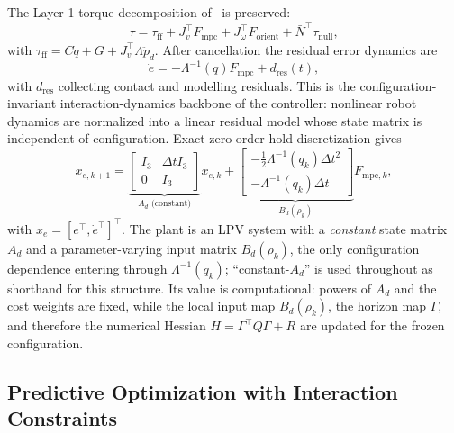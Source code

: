 The Layer-1 torque decomposition of~\cite{cao2026phri} is preserved:
\begin{equation}
\tau = \tau_{\text{ff}} + J_v^\top F_{\text{mpc}} + J_\omega^\top F_{\text{orient}} + \bar{N}^\top \tau_{\text{null}},
\label{eq:torque}
\end{equation}
with $\tau_{\text{ff}} = C\dot{q} + G + J_v^\top \Lambda \ddot{p}_d$. After cancellation the residual error dynamics are
\begin{equation}
\ddot{e} = -\Lambda^{-1}(q) F_{\text{mpc}} + d_{\text{res}}(t),
\label{eq:errdyn}
\end{equation}
with $d_{\text{res}}$ collecting contact and modelling residuals. This is the configuration-invariant interaction-dynamics backbone of the controller: nonlinear robot dynamics are normalized into a linear residual model whose state matrix is independent of configuration. Exact zero-order-hold discretization gives
\begin{equation}
x_{e,k+1} = \underbrace{\begin{bmatrix} I_3 & \Delta t I_3 \\ 0 & I_3 \end{bmatrix}}_{A_d \text{ (constant)}} x_{e,k} + \underbrace{\begin{bmatrix} -\frac12\Lambda^{-1}(q_k)\Delta t^2 \\ -\Lambda^{-1}(q_k) \Delta t \end{bmatrix}}_{B_d(\rho_k)} F_{\text{mpc},k},
\label{eq:discrete}
\end{equation}
with $x_e = [e^\top, \dot{e}^\top]^\top$. The plant is an LPV system with a \emph{constant} state matrix $A_d$ and a parameter-varying input matrix $B_d(\rho_k)$, the only configuration dependence entering through $\Lambda^{-1}(q_k)$; ``constant-$A_d$'' is used throughout as shorthand for this structure. Its value is computational: powers of $A_d$ and the cost weights are fixed, while the local input map $B_d(\rho_k)$, the horizon map $\Gamma$, and therefore the numerical Hessian $H=\Gamma^\top\bar Q\Gamma+\bar R$ are updated for the frozen configuration.

\subsection{Predictive Optimization with Interaction Constraints}\label{sec:qp}

